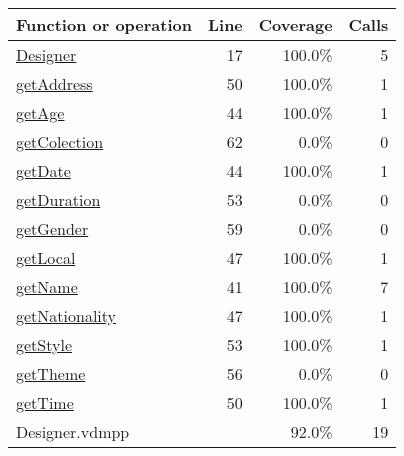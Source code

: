 \begin{longtable}{|l|r|r|r|}
\hline
Function or operation & Line & Coverage & Calls \\
\hline
\hline
\hyperref[Designer:17]{Designer} & 17&100.0\% & 5 \\
\hline
\hyperref[getAddress:50]{getAddress} & 50&100.0\% & 1 \\
\hline
\hyperref[getAge:44]{getAge} & 44&100.0\% & 1 \\
\hline
\hyperref[getColection:62]{getColection} & 62&0.0\% & 0 \\
\hline
\hyperref[getDate:44]{getDate} & 44&100.0\% & 1 \\
\hline
\hyperref[getDuration:53]{getDuration} & 53&0.0\% & 0 \\
\hline
\hyperref[getGender:59]{getGender} & 59&0.0\% & 0 \\
\hline
\hyperref[getLocal:47]{getLocal} & 47&100.0\% & 1 \\
\hline
\hyperref[getName:41]{getName} & 41&100.0\% & 7 \\
\hline
\hyperref[getNationality:47]{getNationality} & 47&100.0\% & 1 \\
\hline
\hyperref[getStyle:53]{getStyle} & 53&100.0\% & 1 \\
\hline
\hyperref[getTheme:56]{getTheme} & 56&0.0\% & 0 \\
\hline
\hyperref[getTime:50]{getTime} & 50&100.0\% & 1 \\
\hline
\hline
Designer.vdmpp & & 92.0\% & 19 \\
\hline
\end{longtable}

